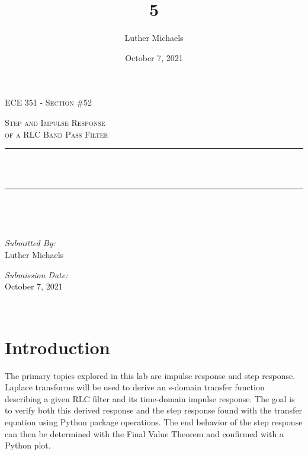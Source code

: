 \documentclass[12pt]{report}
\title{5}	%
\author{Luther Michaels}	%
\date{October 7, 2021}   %
\makeatletter
\let\thetitle\@title
\makeatother
\begin{document}
	
\begin{titlepage}
	\centering
	\vspace*{0.5 cm}
	
	\begin{center}    
		\textsc{\Large   ECE 351 - Section \#52}\\[2.0 cm]	
	\end{center}  
	\textsc{\Large Step and Impulse Response \\ of a RLC Band Pass Filter }\\[0.5 cm]
	\rule{\linewidth}{0.2 mm} \\[0.4 cm]
	{ \huge \bfseries \thetitle}\\
	\rule{\linewidth}{0.2 mm} \\[1.5 cm]
	\begin{minipage}{0.4\textwidth}
		\begin{flushleft} \large
		\end{flushleft}
	\end{minipage}~
	\begin{minipage}{0.4\textwidth}
		\begin{flushright} \large
			\emph{Submitted By:} \\
			Luther Michaels \break
			
			\emph{Submission Date:} \\
			October 7, 2021
		\end{flushright}
	\end{minipage}\\[2 cm]
\end{titlepage}
	
	
\tableofcontents
\pagebreak
	
\renewcommand{\thesection}{\arabic{section}}
\section{Introduction}
	
The primary topics explored in this lab are impulse response and step response. Laplace transforms will be used to derive an s-domain transfer function describing a given RLC filter and its time-domain impulse response. The goal is to verify both this derived response and the step response found with the transfer equation using Python package operations. The end behavior of the step response can then be determined with the Final Value Theorem and confirmed with a Python plot. \\
\end{document}
